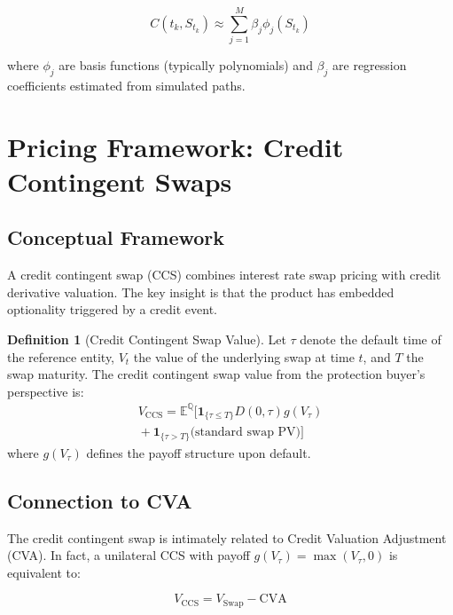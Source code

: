 \documentclass[conference]{IEEEtran}
\theoremstyle{definition}
\newtheorem{definition}{Definition}[section]
\newcommand{\E}{\mathbb{E}}
\newcommand{\Q}{\mathbb{Q}}
\newcommand{\ind}{\mathbf{1}}
\newcommand{\CVA}{\mathrm{CVA}}
\begin{document}
\begin{equation}
C(t_k, S_{t_k}) \approx \sum_{j=1}^{M} \beta_j \phi_j(S_{t_k})
\end{equation}

where $\phi_j$ are basis functions (typically polynomials) and $\beta_j$ are regression coefficients estimated from simulated paths.

\section{Pricing Framework: Credit Contingent Swaps}

\subsection{Conceptual Framework}

A credit contingent swap (CCS) combines interest rate swap pricing with credit derivative valuation. The key insight is that the product has embedded optionality triggered by a credit event.

\begin{definition}[Credit Contingent Swap Value]
Let $\tau$ denote the default time of the reference entity, $V_t$ the value of the underlying swap at time $t$, and $T$ the swap maturity. The credit contingent swap value from the protection buyer's perspective is:
\begin{multline}
V_{\text{CCS}} = \E^{\Q}\bigl[ \ind_{\{\tau \leq T\}} D(0,\tau) g(V_\tau) \\
{}+ \ind_{\{\tau > T\}} \text{(standard swap PV)} \bigr]
\end{multline}
where $g(V_\tau)$ defines the payoff structure upon default.
\end{definition}

\subsection{Connection to CVA}

The credit contingent swap is intimately related to Credit Valuation Adjustment (CVA). In fact, a unilateral CCS with payoff $g(V_\tau) = \max(V_\tau, 0)$ is equivalent to:

\begin{equation}
V_{\text{CCS}} = V_{\text{Swap}} - \CVA
\end{equation}
\end{document}
